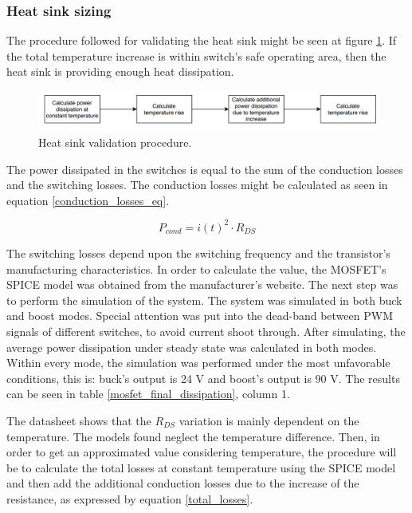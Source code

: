 \subsubsection{Heat sink sizing}

The procedure followed for validating the heat sink might be seen at figure \ref{heat_sink_validation_procedure}. If the total temperature increase is within switch's safe operating area, then the heat sink is providing enough heat dissipation.

\begin{figure}[htbp]
	\begin{center}
		\includegraphics[width=\textwidth]{../Pictures/P1/Component_sizing/heat_sink_validation_procedure.png}
		\caption{Heat sink validation procedure.}
		\label{heat_sink_validation_procedure}
	\end{center}	
\end{figure}

The power dissipated in the switches is equal to the sum of the conduction losses and the switching losses. The conduction losses might be calculated  as seen in equation \ref{conduction_losses_eq}.

\begin{equation} \label{conduction_losses_eq}
P_{cond} = i(t)^2 \cdot R_{DS}
\end{equation}

The switching losses depend upon the switching frequency and the transistor's manufacturing characteristics\cite{mosfet_losses}. In order to calculate the value, the MOSFET's SPICE model was obtained from the manufacturer's website. The next step was to perform the simulation of the system. The system was simulated in both buck and boost modes. Special attention was put into the dead-band between PWM signals of different switches, to avoid current shoot through. After simulating, the average power dissipation under steady state was calculated in both modes. Within every mode, the simulation was performed under the most unfavorable conditions, this is: buck's output is 24 V and boost's output is 90 V. The results can be seen in table \ref{mosfet_final_dissipation}, column 1.

The datasheet shows that the $R_{DS}$ variation is mainly dependent on the temperature\cite{mosfet_datasheet}. The models found neglect the temperature difference. Then, in order to get an approximated value considering temperature, the procedure will be to calculate the total losses at constant temperature using the SPICE model and then add the additional conduction losses due to the increase of the resistance, as expressed by equation \ref{total_losses}.

